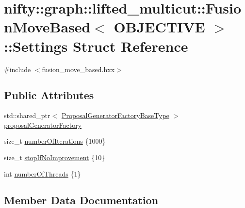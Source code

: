 \hypertarget{structnifty_1_1graph_1_1lifted__multicut_1_1FusionMoveBased_1_1Settings}{}\section{nifty\+:\+:graph\+:\+:lifted\+\_\+multicut\+:\+:Fusion\+Move\+Based$<$ O\+B\+J\+E\+C\+T\+I\+V\+E $>$\+:\+:Settings Struct Reference}
\label{structnifty_1_1graph_1_1lifted__multicut_1_1FusionMoveBased_1_1Settings}


{\ttfamily \#include $<$fusion\+\_\+move\+\_\+based.\+hxx$>$}

\subsection*{Public Attributes}
\begin{DoxyCompactItemize}
\item 
std\+::shared\+\_\+ptr$<$ \hyperlink{classnifty_1_1graph_1_1lifted__multicut_1_1FusionMoveBased_a5694ee53c440514bfeb817b50a14be4b}{Proposal\+Generator\+Factory\+Base\+Type} $>$ \hyperlink{structnifty_1_1graph_1_1lifted__multicut_1_1FusionMoveBased_1_1Settings_a3db403589902b14a0ad8aa05902d0681}{proposal\+Generator\+Factory}
\item 
size\+\_\+t \hyperlink{structnifty_1_1graph_1_1lifted__multicut_1_1FusionMoveBased_1_1Settings_ab678e635215ecb7a1ceecc4e15d08c9a}{number\+Of\+Iterations} \{1000\}
\item 
size\+\_\+t \hyperlink{structnifty_1_1graph_1_1lifted__multicut_1_1FusionMoveBased_1_1Settings_a55f977ae0db0c81f48cb547dbe998ea9}{stop\+If\+No\+Improvement} \{10\}
\item 
int \hyperlink{structnifty_1_1graph_1_1lifted__multicut_1_1FusionMoveBased_1_1Settings_a943408ee423edfc37024fb93c3f6dfdc}{number\+Of\+Threads} \{1\}
\end{DoxyCompactItemize}


\subsection{Member Data Documentation}
\hypertarget{structnifty_1_1graph_1_1lifted__multicut_1_1FusionMoveBased_1_1Settings_ab678e635215ecb7a1ceecc4e15d08c9a}{}
